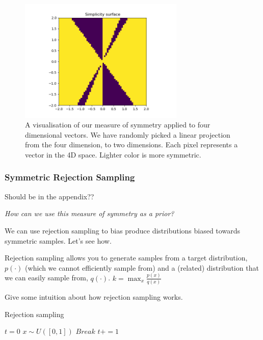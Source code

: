 \begin{figure}[h!]
\centering
\includegraphics[width=0.7\textwidth,height=0.35\textheight]{../../pictures/figures/complexity_surface_nd-4d-S-0.png}
\caption{A visualisation of our measure of symmetry applied to four dimensional vectors.
We have randomly picked a linear projection from the four dimension, to two dimensions.
Each pixel represents a vector in the 4D space. Lighter color is more symmetric.}
\end{figure}


\subsubsection{Symmetric Rejection Sampling}\label{rejection-sampling}
{\color{red}Should be in the appendix??}
\begin{displayquote}
	\textit{How can we use this measure of symmetry as a prior?}
\end{displayquote}

We can use rejection sampling to bias produce distributions biased towards symmetric samples. Let's see how.

Rejection sampling allows you to generate samples from a target distribution, $p(\cdot)$ (which we cannot efficiently sample from) and a (related) distribution that we can easily sample from, $q(\cdot)$.
$k = \mathop{\text{max}}_x \frac{p(x)}{q(x)} $

{\color{red}Give some intuition about how rejection sampling works.}

\begin{algorithm}
	\caption{Rejection sampling}
	\begin{algorithmic}[1]

		\State $t=0$
			\State $x\sim U([0, 1])$
				\State $Break$
			\EndIf
			\State $t += 1$
		\EndWhile
		\State {}
		\EndProcedure

	\end{algorithmic}
\end{algorithm}

